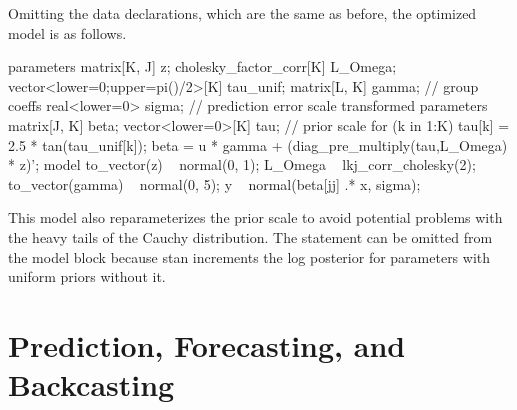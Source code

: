 Omitting the data declarations, which are the same as before, the
optimized model is as follows.
%
\begin{stancode}
parameters {
  matrix[K, J] z;
  cholesky_factor_corr[K] L_Omega;  
  vector<lower=0;upper=pi()/2>[K] tau_unif;  
  matrix[L, K] gamma;                         // group coeffs
  real<lower=0> sigma;                       // prediction error scale
}
transformed parameters {
  matrix[J, K] beta;
  vector<lower=0>[K] tau;     // prior scale
  for (k in 1:K) tau[k] = 2.5 * tan(tau_unif[k]);
  beta = u * gamma + (diag_pre_multiply(tau,L_Omega) * z)';
}
model {
  to_vector(z) ~ normal(0, 1); 
  L_Omega ~ lkj_corr_cholesky(2);
  to_vector(gamma) ~ normal(0, 5);
  y ~ normal(beta[jj] .* x, sigma);
}
\end{stancode}

This model also reparameterizes the prior scale  to avoid potential problems with the heavy tails of the Cauchy distribution. The statement  can be omitted from the model block because stan increments the log posterior for parameters with uniform priors without it.




\section{Prediction, Forecasting, and Backcasting}

